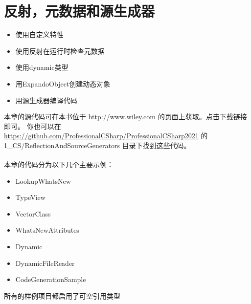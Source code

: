 \chapter{反射，元数据和源生成器}
\underline{}

\begin{itemize}
\item 使用自定义特性
\item 使用反射在运行时检查元数据
\item 使用dynamic类型
\item 用ExpandoObject创建动态对象
\item 用源生成器编译代码
\end{itemize}
\medskip
\underline{}

本章的源代码可在本书位于 \url{http://www.wiley.com} 的页面上获取。点击下载链接即可。
你也可以在 \url{https://github.com/ProfessionalCSharp/ProfessionalCSharp2021} 的 1\_CS/ReflectionAndSourceGenerators 目录下找到这些代码。
\\ \\
本章的代码分为以下几个主要示例：
\begin{itemize}
\item LookupWhatsNew
\item TypeView
\item VectorClass
\item WhatsNewAttributes
\item Dynamic
\item DynamicFileReader
\item CodeGenerationSample
\end{itemize}
所有的样例项目都启用了可空引用类型

